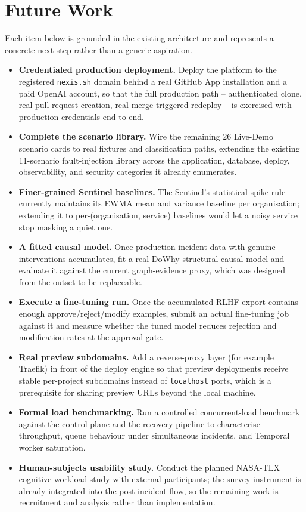 \section{Future Work}

Each item below is grounded in the existing architecture and represents a
concrete next step rather than a generic aspiration.

\begin{itemize}
  \item \textbf{Credentialed production deployment.} Deploy the platform to
  the registered \texttt{nexis.sh} domain behind a real GitHub App
  installation and a paid OpenAI account, so that the full production path
  -- authenticated clone, real pull-request creation, real merge-triggered
  redeploy -- is exercised with production credentials end-to-end.
  \item \textbf{Complete the scenario library.} Wire the remaining 26
  Live-Demo scenario cards to real fixtures and classification paths,
  extending the existing 11-scenario fault-injection library across the
  application, database, deploy, observability, and security categories it
  already enumerates.
  \item \textbf{Finer-grained Sentinel baselines.} The Sentinel's
  statistical spike rule currently maintains its EWMA mean and variance
  baseline per organisation; extending it to per-(organisation, service)
  baselines would let a noisy service stop masking a quiet one.
  \item \textbf{A fitted causal model.} Once production incident data with
  genuine interventions accumulates, fit a real DoWhy structural causal
  model \cite{dowhy} and evaluate it against the current graph-evidence
  proxy, which was designed from the outset to be replaceable.
  \item \textbf{Execute a fine-tuning run.} Once the accumulated RLHF export
  contains enough approve/reject/modify examples, submit an actual
  fine-tuning job against it and measure whether the tuned model reduces
  rejection and modification rates at the approval gate.
  \item \textbf{Real preview subdomains.} Add a reverse-proxy layer (for
  example Traefik) in front of the deploy engine so that preview
  deployments receive stable per-project subdomains instead of
  \texttt{localhost} ports, which is a prerequisite for sharing preview
  URLs beyond the local machine.
  \item \textbf{Formal load benchmarking.} Run a controlled concurrent-load
  benchmark against the control plane and the recovery pipeline to
  characterise throughput, queue behaviour under simultaneous incidents,
  and Temporal worker saturation.
  \item \textbf{Human-subjects usability study.} Conduct the planned
  NASA-TLX cognitive-workload study \cite{nasatlx} with external
  participants; the survey instrument is already integrated into the
  post-incident flow, so the remaining work is recruitment and analysis
  rather than implementation.
\end{itemize}


